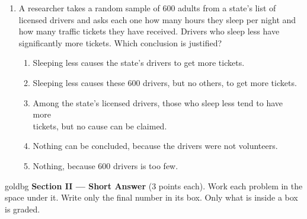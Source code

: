 \documentclass[12pt]{article}
\begin{document}
\begin{enumerate}[leftmargin=1.9em, itemsep=0.13in]
  \boxguard[13]
  \item A researcher takes a random sample of 600 adults from a state's list of licensed
        drivers and asks each one how many hours they sleep per night and how many traffic
        tickets they have received. Drivers who sleep less have significantly more tickets.
        Which conclusion is justified?
        \begin{enumerate}[label=\textbf{(\Alph*)}, leftmargin=2.2em, itemsep=2pt]
          \item Sleeping less causes the state's drivers to get more tickets.
          \item Sleeping less causes these 600 drivers, but no others, to get more tickets.
          \item Among the state's licensed drivers, those who sleep less tend to have more\\
                tickets, but no cause can be claimed.
          \item Nothing can be concluded, because the drivers were not volunteers.
          \item Nothing, because 600 drivers is too few.\hfill{}\rule[-0.2in]{0pt}{0.48in}
        \end{enumerate}

\end{enumerate}

\vspace{0.14in}

\boxguard[22]
\begin{headlinebox}{goldbg}
\small
\textbf{Section II --- Short Answer} (3 points each). Work each problem in the space under it.
Write only the final number in its box. Only what is inside a box is graded.
\end{headlinebox}

\vspace{0.10in}
\end{document}
